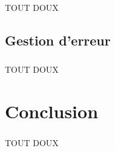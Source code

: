 \documentclass{report}
\begin{document}
\paragraph*{}
TOUT DOUX

\section*{Gestion d'erreur}
\paragraph*{}
TOUT DOUX


\chapter*{Conclusion}
\paragraph*{}
TOUT DOUX
\end{document}
